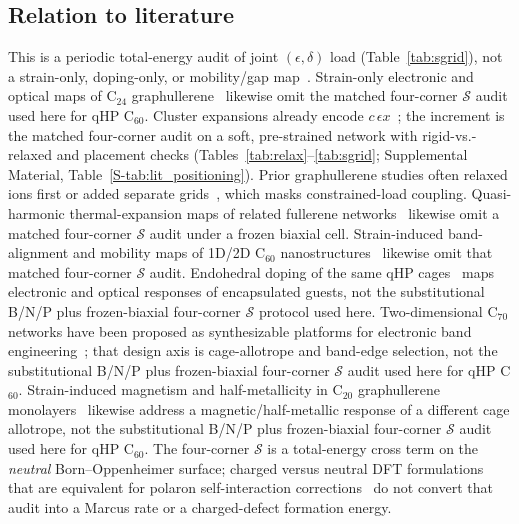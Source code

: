 \documentclass[%
 reprint,
 groupedaddress,
 amsmath,amssymb,
 aps,
 prb,
 floatfix,
]{revtex4-2}
\begin{document}


\subsection{Relation to literature}
\label{sec:discussion_literature}

This is a periodic total-energy audit of joint $(\epsilon,\delta)$ load (Table~\ref{tab:sgrid}), not a strain-only, doping-only, or mobility/gap map~\cite{Capobianco2024electron,Li2024strain,Khan2025tuning,Peng2025monolayer,Lee2023localised}.
Strain-only electronic and optical maps of C$_{24}$ graphullerene~\cite{Li2024graphullerene} likewise omit the matched four-corner $\mathcal{S}$ audit used here for qHP C$_{60}$.
Cluster expansions already encode $c\,\epsilon x$~\cite{Sanchez1984generalized,Laks1992efficient}; the increment is the matched four-corner audit on a soft, pre-strained network with rigid-vs.-relaxed and placement checks (Tables~\ref{tab:relax}--\ref{tab:sgrid}; Supplemental Material, Table~\ref{S-tab:lit_positioning}).
Prior graphullerene studies often relaxed ions first or added separate grids~\cite{Capobianco2024electron,Li2024strain,Khan2025tuning}, which masks constrained-load coupling.
Quasi-harmonic thermal-expansion maps of related fullerene networks~\cite{ShaikhPeng2025thermal} likewise omit a matched four-corner $\mathcal{S}$ audit under a frozen biaxial cell.
Strain-induced band-alignment and mobility maps of 1D/2D C$_{60}$ nanostructures~\cite{Shi2023strainC60} likewise omit that matched four-corner $\mathcal{S}$ audit.
Endohedral doping of the same qHP cages~\cite{Pereira2026endohedral} maps electronic and optical responses of encapsulated guests, not the substitutional B/N/P plus frozen-biaxial four-corner $\mathcal{S}$ protocol used here.
Two-dimensional C$_{70}$ networks have been proposed as synthesizable platforms for electronic band engineering~\cite{Xu2025C70network}; that design axis is cage-allotrope and band-edge selection, not the substitutional B/N/P plus frozen-biaxial four-corner $\mathcal{S}$ audit used here for qHP C$_{60}$.
Strain-induced magnetism and half-metallicity in C$_{20}$ graphullerene monolayers~\cite{Nie2026strainC20} likewise address a magnetic/half-metallic response of a different cage allotrope, not the substitutional B/N/P plus frozen-biaxial four-corner $\mathcal{S}$ audit used here for qHP C$_{60}$.
The four-corner $\mathcal{S}$ is a total-energy cross term on the \emph{neutral} Born--Oppenheimer surface; charged versus neutral DFT formulations that are equivalent for polaron self-interaction corrections~\cite{Falletta2025polaronDFT} do not convert that audit into a Marcus rate or a charged-defect formation energy.
\end{document}
